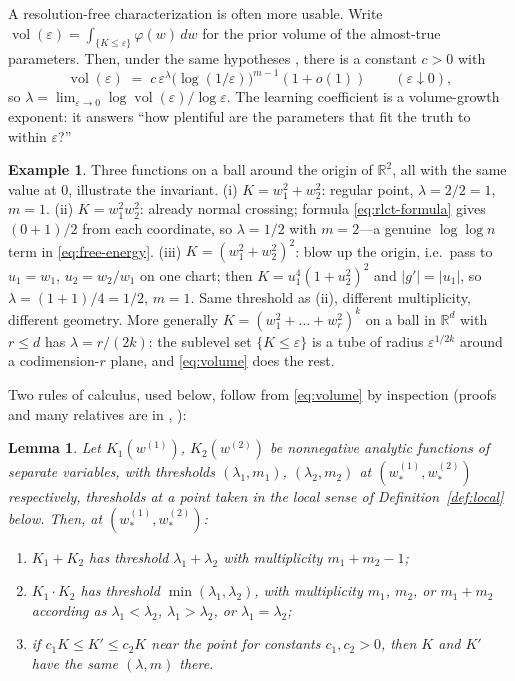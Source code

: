 \documentclass[11pt]{amsart}
\theoremstyle{plain}
\newtheorem{lemma}[theorem]{Lemma}
\theoremstyle{definition}
\newtheorem{example}[theorem]{Example}
\newcommand{\R}{\mathbb{R}}
\DeclareMathOperator{\vol}{vol}
\begin{document}
A resolution-free characterization is often more usable. Write $\vol(\varepsilon) = \int_{\{K \le \varepsilon\}} \varphi(w)\,dw$ for the prior volume of the almost-true parameters. Then, under the same hypotheses \cite[Ch.~4]{watanabe2009}, there is a constant $c > 0$ with
\begin{equation}\label{eq:volume}
   \vol(\varepsilon) \;=\; c\,\varepsilon^{\lambda}\bigl(\log(1/\varepsilon)\bigr)^{m-1}(1 + o(1)) \qquad (\varepsilon \downarrow 0),
\end{equation}
so $\lambda = \lim_{\varepsilon\to 0} \log \vol(\varepsilon)/\log\varepsilon$. The learning coefficient is a volume-growth exponent: it answers ``how plentiful are the parameters that fit the truth to within $\varepsilon$?''

\begin{example}\label{ex:baby}
Three functions on a ball around the origin of $\R^2$, all with the same value at $0$, illustrate the invariant.
(i) $K = w_1^2 + w_2^2$: regular point, $\lambda = 2/2 = 1$, $m = 1$.
(ii) $K = w_1^2 w_2^2$: already normal crossing; formula \eqref{eq:rlct-formula} gives $(0+1)/2$ from each coordinate, so $\lambda = 1/2$ with $m = 2$---a genuine $\log\log n$ term in \eqref{eq:free-energy}.
(iii) $K = (w_1^2 + w_2^2)^2$: blow up the origin, i.e.\ pass to $u_1 = w_1$, $u_2 = w_2/w_1$ on one chart; then $K = u_1^4 (1 + u_2^2)^2$ and $|g'| = |u_1|$, so $\lambda = (1+1)/4 = 1/2$, $m = 1$. Same threshold as (ii), different multiplicity, different geometry. More generally $K = (w_1^2 + \dots + w_r^2)^k$ on a ball in $\R^d$ with $r \le d$ has $\lambda = r/(2k)$: the sublevel set $\{K \le \varepsilon\}$ is a tube of radius $\varepsilon^{1/2k}$ around a codimension-$r$ plane, and \eqref{eq:volume} does the rest.
\end{example}

Two rules of calculus, used below, follow from \eqref{eq:volume} by inspection (proofs and many relatives are in \cite[\S7]{lin2011}, \cite{watanabe2009}):

\begin{lemma}\label{lem:calculus}
Let $K_1(w^{(1)})$, $K_2(w^{(2)})$ be nonnegative analytic functions of separate variables, with thresholds $(\lambda_1, m_1)$, $(\lambda_2, m_2)$ at $(w^{(1)}_*, w^{(2)}_*)$ respectively, thresholds at a point taken in the local sense of Definition~\ref{def:local} below. Then, at $(w^{(1)}_*, w^{(2)}_*)$\textup{:}
\begin{enumerate}
\item[(i)] $K_1 + K_2$ has threshold $\lambda_1 + \lambda_2$ with multiplicity $m_1 + m_2 - 1$\textup{;}
\item[(ii)] $K_1 \cdot K_2$ has threshold $\min(\lambda_1, \lambda_2)$, with multiplicity $m_1$, $m_2$, or $m_1 + m_2$ according as $\lambda_1 < \lambda_2$, $\lambda_1 > \lambda_2$, or $\lambda_1 = \lambda_2$\textup{;}
\item[(iii)] if $c_1 K \le K' \le c_2 K$ near the point for constants $c_1, c_2 > 0$, then $K$ and $K'$ have the same $(\lambda, m)$ there.
\end{enumerate}
\end{lemma}
\end{document}
